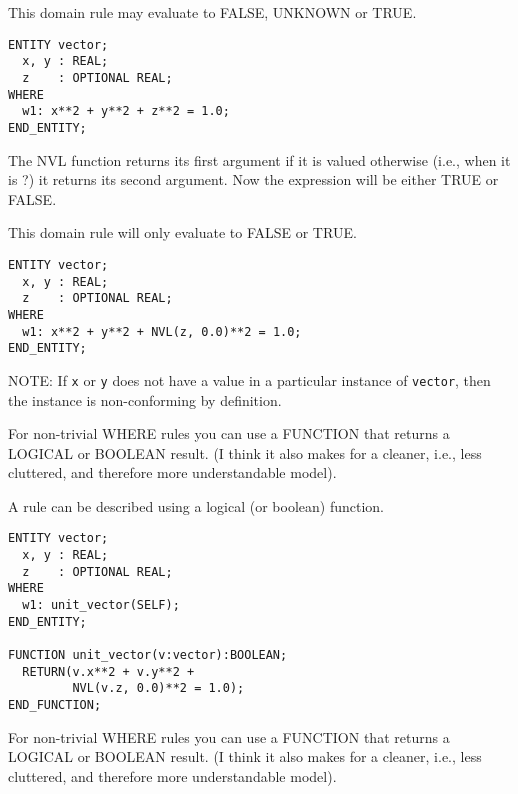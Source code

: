
    This domain rule may evaluate to FALSE, UNKNOWN or TRUE.

\begin{verbatim}
ENTITY vector;
  x, y : REAL;
  z    : OPTIONAL REAL;
WHERE
  w1: x**2 + y**2 + z**2 = 1.0;
END_ENTITY;
\end{verbatim}


\begin{remarks}
\remintro
{}

The NVL function returns its first argument if it is valued otherwise
(i.e., when it is ?) it returns its second argument. Now the
expression will be either TRUE or FALSE.

\remend
\end{remarks}


    This domain rule will only evaluate to FALSE or TRUE.

\begin{verbatim}
ENTITY vector;
  x, y : REAL;
  z    : OPTIONAL REAL;
WHERE
  w1: x**2 + y**2 + NVL(z, 0.0)**2 = 1.0;
END_ENTITY;
\end{verbatim}

NOTE: If \texttt{x} or \texttt{y} does not have a value in a particular
instance of \texttt{vector}, then the instance is non-conforming 
by definition.


\begin{remarks}
\remintro
{}

    For non-trivial WHERE rules you can use a FUNCTION that returns
a LOGICAL or BOOLEAN result. (I think it also makes for a cleaner, i.e.,
less cluttered, and therefore more understandable model).

\remend
\end{remarks}


    A rule can be described using a logical (or boolean) function.

\begin{verbatim}
ENTITY vector;
  x, y : REAL;
  z    : OPTIONAL REAL;
WHERE
  w1: unit_vector(SELF);
END_ENTITY;

FUNCTION unit_vector(v:vector):BOOLEAN;
  RETURN(v.x**2 + v.y**2 + 
         NVL(v.z, 0.0)**2 = 1.0);
END_FUNCTION;
\end{verbatim}

\begin{remarks}
\remintro
{}

    For non-trivial WHERE rules you can use a FUNCTION that returns
a LOGICAL or BOOLEAN result. (I think it also makes for a cleaner, i.e.,
less cluttered, and therefore more understandable model).

\remend
\end{remarks}

